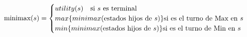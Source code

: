 \documentclass[preview]{standalone}
\begin{document}
\begin{align*}
\text{minimax($s$)} =  \begin{cases}
                                 utility(s) \quad \text{si $s$ es terminal} \cr
                                 max\{minimax(\text{estados hijos de $s$})\} \text{si es el turno de Max en $s$} \cr
                                 min\{minimax(\text{estados hijos de $s$})\} \text{si es el turno de Min en $s$} \cr
                                 \end{cases}
\end{align*}
\end{document}
